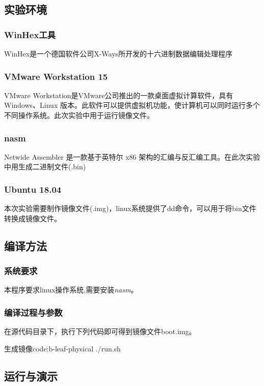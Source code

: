\documentclass[a4paper, 11pt]{article} %
\newcounter{code}
\begin{document}
\subsection{实验环境}

\subsubsection{WinHex工具}
WinHex是一个德国软件公司X-Ways所开发的十六进制数据编辑处理程序
\subsubsection{VMware Workstation 15}
VMware Workstation是VMware公司推出的一款桌面虚拟计算软件，具有Windows、Linux 版本。此软件可以提供虚拟机功能，使计算机可以同时运行多个不同操作系统。此次实验中用于运行镜像文件。
\subsubsection{nasm}
Netwide Assembler 是一款基于英特尔 x86 架构的汇编与反汇编工具。在此次实验中用生成二进制文件(.bin)
\subsubsection{Ubuntu 18.04}
本次实验需要制作镜像文件(.img)，linux系统提供了dd命令，可以用于将bin文件转换成镜像文件。

\subsection{编译方法}
\subsubsection{系统要求}

本程序要求linux操作系统,需要安装\textit{nasm}。

\subsubsection{编译过程与参数}

在源代码目录下，执行下列代码即可得到镜像文件boot.img。
\begin{code}{生成镜像}{code:b-leaf-physical}
  ./run.sh
\end{code}

\subsection{运行与演示}
\end{document}
